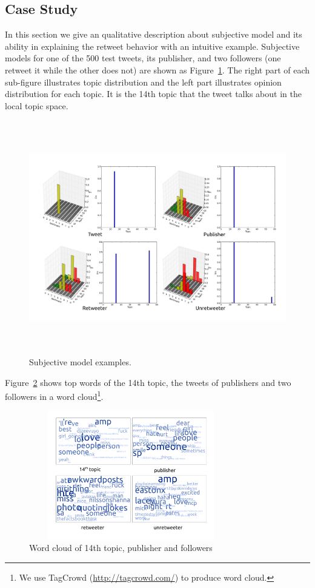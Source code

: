 \documentclass{acm_proc_article-sp}
\begin{document}
\subsection{Case Study}
\label{example}
In this section we give an qualitative description about subjective model and its ability in explaining the retweet behavior with an intuitive example. 
Subjective models for one of the 500 test tweets, its publisher, and two followers (one retweet it while the other does not) are shown as Figure~\ref{fig:graph4}. 
The right part of each sub-figure illustrates topic distribution and the left part illustrates opinion distribution for each topic. 
It is the 14th topic that the tweet talks about in the local topic space.
\begin{figure}[htb]
\centering%
\includegraphics[width=7in,height=4in]{tweets10.pdf}
\caption{Subjective model examples.}
\label{fig:graph4}
\end{figure}
Figure~\ref{fig:graph5} shows top words of the 14th topic, the tweets of publishers and two followers in a word cloud\footnote{We use TagCrowd (\url{http://tagcrowd.com/}) to produce word cloud.}.
\begin{figure}[htb]
\centering
\includegraphics[width=3.5in,height=2.2in]{text_cloud.pdf}
\caption{Word cloud of 14th topic, publisher and followers}
\label{fig:graph5}
\end{figure}
\end{document}
